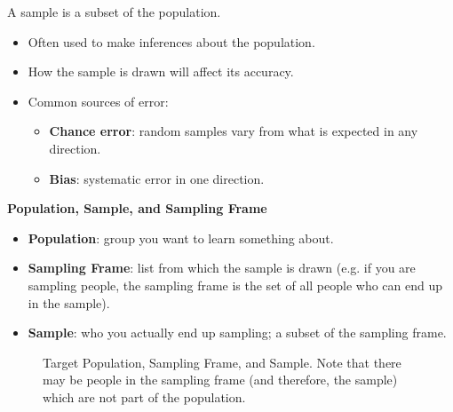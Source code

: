 \begin{definition}[Sample]{A sample is a subset of the population.
\begin{itemize}
\item Often used to make inferences about the population.
\item How the sample is drawn will affect its accuracy.
\item Common sources of error:
\begin{itemize}
\item \textbf{Chance error}: random samples vary from what is expected in any direction.
\item \textbf{Bias}: systematic error in one direction.
\end{itemize}
\end{itemize}
}
\end{definition}
\textbf{Population, Sample, and Sampling Frame}
\begin{itemize}
\item \textbf{Population}: group you want to learn something about.
\item \textbf{Sampling Frame}: list from which the sample is drawn (e.g. if you are sampling people, the sampling frame is the set of all people who can end up in the sample).
\item \textbf{Sample}: who you actually end up sampling; a subset of the sampling frame.
\end{itemize}
\begin{figure}[ht]
\begin{center}
\end{center}
\caption{Target Population, Sampling Frame, and Sample. Note that there may be people in the sampling frame (and therefore, the sample) which are not part of the population.}
\end{figure}

